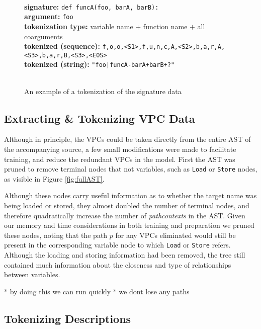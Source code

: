 \begin{figure}[h!]

\hrulefill\\
    \textbf{signature:} \texttt{def funcA(foo, barA, barB):}\\
    \textbf{argument:} \texttt{foo} \\
    \textbf{tokenization type:} variable name $+$ function name $+$ all coarguments \\
    \textbf{tokenized (sequence):} \texttt{f,o,o,<S1>,f,u,n,c,A,<S2>,b,a,r,A,<S3>,b,a,r,B,<S3>,<EOS>}\\
    \textbf{tokenized (string):} \texttt{"foo|funcA-barA+barB+?"}\\
\hrulefill\\ 
    \caption{An example of a tokenization of the signature data}
    \label{fig:tokenizatio}
\end{figure}

\subsection{Extracting \& Tokenizing VPC Data }
Although in principle, the VPCs could be taken directly from the entire AST of the accompanying source, a few small modifications were made to facilitate training, and reduce the redundant VPCs in the model. 
First the AST was pruned to remove terminal nodes that not variables, such as \texttt{Load} or \texttt{Store} nodes, as visible in Figure \ref{fig:fullAST}. 

Although these nodes carry useful information as to whether the target name was being loaded or stored, they almost doubled the number of terminal nodes, and therefore quadratically increase the number of \textit{pathcontexts} in the AST. Given our memory and time considerations in both training and preparation we pruned these nodes, noting that the path $p$ for any VPCs eliminated would still be present in the corresponding variable node to which \texttt{Load} or \texttt{Store} refers. 
Although the loading and storing information had been removed, the tree still contained much information about the closeness and type of relationships between variables.

* by doing this we can run quickly
* we dont lose any paths





\subsection{Tokenizing Descriptions}





